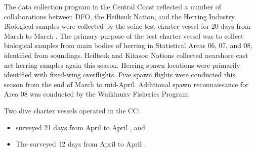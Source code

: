 The data collection program in the Central Coast reflected
a number of collaborations between
DFO, the Heiltsuk Nation, and the Herring Industry.
Biological samples were collected by the seine test charter vessel
 for 20 days from March  to March .
The primary purpose of the test charter vessel was to
collect biological samples from main bodies of herring
in Statistical Areas 06, 07, and 08, identified from soundings.
Heiltsuk and Kitasoo Nations collected nearshore
cast net herring samples again this season.
Herring spawn locations were primarily identified with fixed-wing overflights.
Five spawn flights were conducted this season from
the end of March to mid-April.
Additional spawn reconnaissance for Area 08 was conducted
by the Wuikinuxv Fisheries Program.

Two dive charter vessels operated in the CC:

\begin{itemize}

\item {} surveyed 21 days from
April  to April , and

\item The  surveyed 12 days from
April  to April .

\end{itemize}